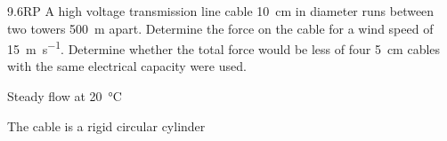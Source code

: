 

\begin{problem}{9.6RP}
  A high voltage transmission line cable \qty{10}{\cm} in diameter runs between two towers \qty{500}{\m} apart.
  Determine the force on the cable for a wind speed of \qty{15}{\m\per\s}.
  Determine whether the total force would be less of four \qty{5}{\cm} cables with the same electrical capacity were used.
\end{problem}

\begin{assumptions}
  \item Steady flow at \qty{20}{\celsius} 
  \item The cable is a rigid circular cylinder
\end{assumptions}

